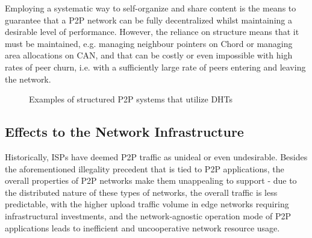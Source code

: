     Employing a systematic way to self-organize and share content is the means to guarantee that a P2P network can be fully decentralized whilst maintaining a desirable level of performance.
    However, the reliance on structure means that it must be maintained, e.g. managing neighbour pointers on Chord or managing area allocations on CAN, and that can be costly or even impossible with high rates of peer churn, i.e. with a sufficiently large rate of peers entering and leaving the network.

\begin{figure}%
\centering
{}%
\qquad
{}%
\caption{Examples of structured P2P systems that utilize DHTs}
\label{fig:dht-usage}
\end{figure}


\subsection{Effects to the Network Infrastructure}


    Historically, ISPs have deemed P2P traffic as unideal or even undesirable.
    Besides the aforementioned illegality precedent that is tied to P2P applications, the overall properties of P2P networks make them unappealing to support - due to the distributed nature of these types of networks, the overall traffic is less predictable, with the higher upload traffic volume in edge networks requiring infrastructural investments, and the network-agnostic operation mode of P2P applications leads to inefficient and uncooperative network resource usage.

